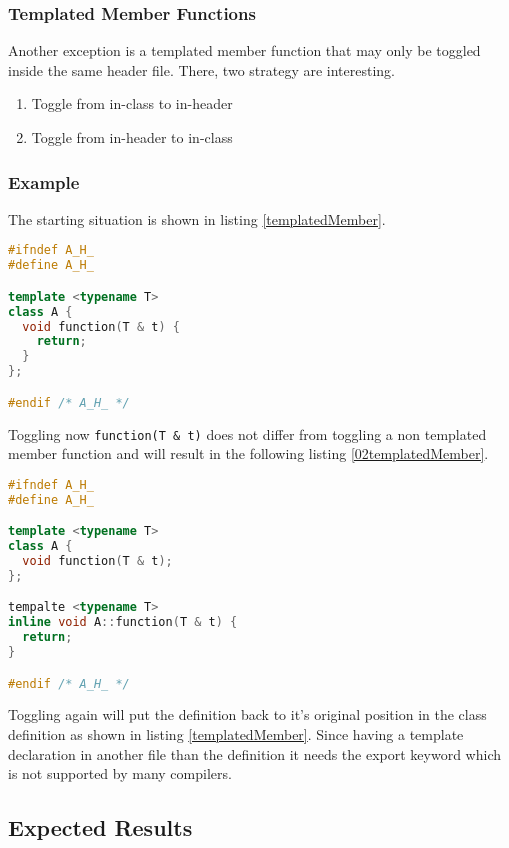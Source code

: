 \subsubsection{Templated Member Functions}

Another exception is a templated member function that may only be toggled
inside the same header file. There, two strategy are interesting.
\begin{enumerate}
\item Toggle from in-class to in-header
\item Toggle from in-header to in-class
\end{enumerate}

\subsubsection*{Example}
\label{templatedmember}

The starting situation is shown in listing \ref{templatedMember}.

\begin{lstlisting}[caption={A.h, in class definition with template parameters},
label={templatedMember}, language=C++]
#ifndef A_H_
#define A_H_

template <typename T>
class A {
  void function(T & t) {
    return;
  }
};

#endif /* A_H_ */
\end{lstlisting}

Toggling now \texttt{function(T \& t)} does not differ from toggling a non
templated member function and will result in the following listing
\ref{02templatedMember}.

\begin{lstlisting}[caption={A.h, in header definition with template parameters},
label={02templatedMember}, language=C++]
#ifndef A_H_
#define A_H_

template <typename T>
class A {
  void function(T & t);
};

tempalte <typename T>
inline void A::function(T & t) {
  return;
}

#endif /* A_H_ */
\end{lstlisting}

Toggling again will put the definition back to it's original position in the
class definition as shown in listing \ref{templatedMember}. Since having a
template declaration in another file than the definition it needs the export
keyword which is not supported by many compilers.

\subsection{Expected Results}

